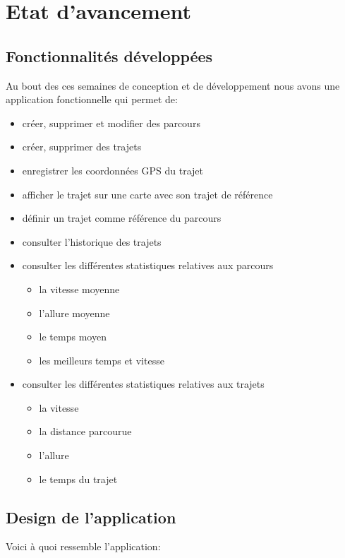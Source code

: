 \chapter{Etat d'avancement}
\section{Fonctionnalités développées}
Au bout des ces semaines de conception et de développement nous avons une application fonctionnelle qui permet de:\bigskip

\begin{itemize}
 	\item créer, supprimer et modifier des parcours
 	\item créer, supprimer des trajets
 	\item enregistrer les coordonnées GPS du trajet 
 	\item afficher le trajet sur une carte avec son trajet de référence
 	\item définir un trajet comme référence du parcours
	\item consulter l'historique des trajets 
	\item consulter les différentes statistiques relatives aux parcours 
	\begin{itemize}
		\item la vitesse moyenne
		\item l'allure moyenne
		\item le temps moyen 
		\item les meilleurs temps et vitesse 
	\end{itemize}
 	\item consulter les différentes statistiques relatives aux trajets 
	\begin{itemize}
		\item la vitesse
		\item la distance parcourue
		\item l'allure
		\item le temps du trajet 
	\end{itemize}
\end{itemize}\bigskip

\newpage

\section{Design de l'application}
Voici à quoi ressemble l'application:\bigskip 

